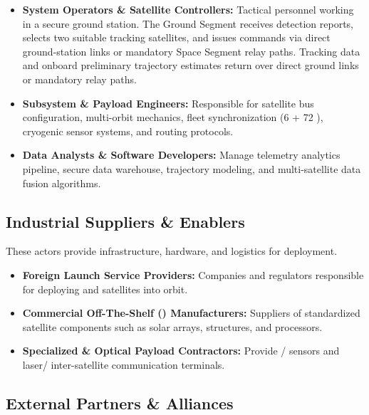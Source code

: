 \begin{itemize}
    \item \textbf{System Operators \& Satellite Controllers:} Tactical personnel working in a secure ground station. The Ground Segment receives  detection reports, selects two suitable  tracking satellites, and issues commands via direct ground-station links or mandatory Space Segment  relay paths. Tracking data and onboard preliminary trajectory estimates return over direct ground links or mandatory  relay paths.
    
    \item \textbf{Subsystem \& Payload Engineers:} Responsible for satellite bus configuration, multi-orbit mechanics, fleet synchronization (6  + 72 ), cryogenic  sensor systems, and  routing protocols.
    
    \item \textbf{Data Analysts \& Software Developers:} Manage telemetry analytics pipeline, secure data warehouse, trajectory modeling, and multi-satellite data fusion algorithms.
\end{itemize}

\subsection{Industrial Suppliers \& Enablers}

These actors provide infrastructure, hardware, and logistics for deployment.

\begin{itemize}
    \item \textbf{Foreign Launch Service Providers:} Companies and regulators responsible for deploying  and  satellites into orbit.
    
    \item \textbf{Commercial Off-The-Shelf () Manufacturers:} Suppliers of standardized satellite components such as solar arrays, structures, and processors.
    
    \item \textbf{Specialized  \& Optical Payload Contractors:} Provide / sensors and laser/ inter-satellite communication terminals.
\end{itemize}

\subsection{External Partners \& Alliances}

